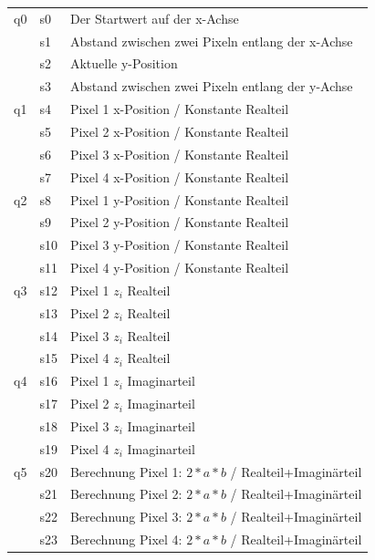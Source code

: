 \documentclass[11pt]{scrartcl}
\begin{document}
\begin{table}[!ht]
  \begin{center}
    \begin{tabular}{| l | l | l |}
      \hline
      q0 & s0 & Der Startwert auf der x-Achse \\ \cline{2-3}
      & s1 & Abstand zwischen zwei Pixeln entlang der x-Achse \\ \cline{2-3}
      & s2 & Aktuelle y-Position\\ \cline{2-3}
      & s3 & Abstand zwischen zwei Pixeln entlang der y-Achse\\ \hline

      q1 & s4 & Pixel 1 x-Position / Konstante Realteil \\ \cline{2-3}
      & s5&  Pixel 2 x-Position / Konstante Realteil\\ \cline{2-3}
      & s6&  Pixel 3 x-Position / Konstante Realteil\\ \cline{2-3}
      & s7&  Pixel 4 x-Position / Konstante Realteil\\ \hline

      q2& s8&  Pixel 1 y-Position / Konstante Realteil\\ \cline{2-3}
      & s9&  Pixel 2 y-Position / Konstante Realteil\\ \cline{2-3}
      & s10&  Pixel 3 y-Position / Konstante Realteil\\ \cline{2-3}
      & s11&  Pixel 4 y-Position / Konstante Realteil\\ \hline

      q3& s12&  Pixel 1 $z_i$ Realteil\\ \cline{2-3}
      & s13& Pixel 2 $z_i$ Realteil\\ \cline{2-3}
      & s14& Pixel 3 $z_i$ Realteil\\ \cline{2-3}
      & s15& Pixel 4 $z_i$ Realteil\\ \hline

      q4& s16& Pixel 1 $z_i$ Imaginarteil\\ \cline{2-3}
      & s17&  Pixel 2 $z_i$ Imaginarteil\\ \cline{2-3}
      & s18&  Pixel 3 $z_i$ Imaginarteil\\ \cline{2-3}
      & s19&  Pixel 4 $z_i$ Imaginarteil\\ \hline

      q5& s20& Berechnung Pixel 1: $2*a*b$ / Realteil+Imaginärteil \\ \cline{2-3}
      & s21& Berechnung Pixel 2: $2*a*b$ / Realteil+Imaginärteil\\ \cline{2-3}
      & s22& Berechnung Pixel 3: $2*a*b$ / Realteil+Imaginärteil\\ \cline{2-3}
      & s23& Berechnung Pixel 4: $2*a*b$ / Realteil+Imaginärteil\\ \hline


\end{tabular}
\end{center}
\end{table}
\end{document}

